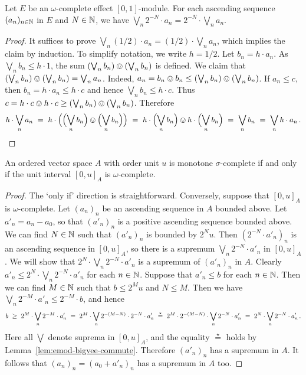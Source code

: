 \documentclass[%
	submission,
copyright,creativecommons,UKenglish]{eptcs}
\begin{document}
\begin{lemma}
\label{lem:emod-bigvee-commute}
Let $E$ be an $\omega$-complete effect $[0,1]$-module.
For each ascending sequence $(a_n)_{n\in\mathbb{N}}$
in $E$ and $N\in\mathbb{N}$, we have
$\bigvee_n 2^{-N}\cdot a_n = 2^{-N}\cdot \bigvee_n a_n$.
\end{lemma}
\begin{proof}
It suffices to prove
$\bigvee_n (1/2)\cdot a_n = (1/2)\cdot \bigvee_n a_n$,
which implies the claim by induction.
To simplify notation, we write $h=1/2$.
Let $b_n=h\cdot a_n$.
As $\bigvee_n b_n\le h\cdot 1$,
the sum $(\bigvee_n b_n)\ovee (\bigvee_n b_n)$ is defined.
We claim that
$(\bigvee_n b_n)\ovee (\bigvee_n b_n)=\bigvee_n a_n$.
Indeed, $a_n=b_n\ovee b_n\le (\bigvee_n b_n)\ovee (\bigvee_n b_n)$.
If $a_n\le c$,
then $b_n=h\cdot a_n\le h\cdot c$
and hence $\bigvee_n b_n\le h\cdot c$.
Thus $c=h\cdot c\ovee h\cdot c
\ge (\bigvee_n b_n)\ovee (\bigvee_n b_n)$.
Therefore
\[
h\cdot \bigvee_n a_n
\ =\  h\cdot
\qty\Big(\qty\Big(\bigvee_n b_n)\ovee \qty\Big(\bigvee_n b_n))
\ =\  h\cdot \qty\Big(\bigvee_n b_n)\ovee h\cdot \qty\Big(\bigvee_n b_n)
\ =\  \bigvee_n b_n
\ =\  \bigvee_n h\cdot a_n
\,\text{.}
\qedhere
\]
\end{proof}

\begin{lemma}
\label{lem:monotone-sigma-complete-iff-omega-complete}
An ordered vector space $A$ with order unit $u$
is monotone $\sigma$-complete
if and only if the unit interval $[0,u]_A$ is
$\omega$-complete.
\end{lemma}
\begin{proof}
The `only if' direction is straightforward.
Conversely,
suppose that $[0,u]_A$ is
$\omega$-complete.
Let $(a_n)_n$ be an ascending sequence in $A$ bounded above.
Let $a'_n=a_n-a_0$,
so that
$(a'_n)_n$ is a positive ascending sequence bounded above.
We can find
$N\in\mathbb{N}$ such that $(a'_n)_n$ is bounded by $2^N u$.
Then $(2^{-N}\cdot a'_n)_n$ is an ascending sequence in $[0,u]_A$,
so there is a supremum $\bigvee_n 2^{-N}\cdot a'_n$ in $[0,u]_A$.
We will show that
$2^{N}\cdot \bigvee_n 2^{-N}\cdot a'_n$ is a supremum of $(a'_n)_n$
in $A$. Clearly
$a'_n\le 2^{N}\cdot \bigvee_n 2^{-N}\cdot a'_n$ for each $n\in\mathbb{N}$.
Suppose that $a'_n\le b$ for each $n\in\mathbb{N}$.
Then we can find $M\in\mathbb{N}$ such that
$b\le 2^M u$ and $N\le M$.
Then we have $\bigvee_n 2^{-M}\cdot a'_n\le 2^{-M}\cdot b$,
and hence
\[
b \ \ge\  2^{M}\cdot \bigvee_n 2^{-M}\cdot a'_n
\ =\  2^{M}\cdot \bigvee_n 2^{-(M-N)}\cdot 2^{-N}\cdot a'_n
\ \overset{\star}= \ 
2^{M}\cdot 2^{-(M-N)}\cdot \bigvee_n 2^{-N}\cdot a'_n
\ =\  2^{N}\cdot \bigvee_n 2^{-N}\cdot a'_n
\mpunct.
\]
Here all $\bigvee$ denote suprema in $[0,u]_A$,
and the equality $\overset{\star}=$ holds
by Lemma~\ref{lem:emod-bigvee-commute}.
Therefore
$(a'_n)_n$ has a supremum in $A$.
It follows that $(a_n)_n=(a_0+a'_n)_n$
has a supremum in $A$ too.
\end{proof}
\end{document}
